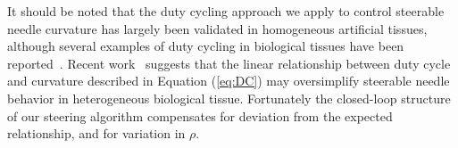 It should be noted that the duty cycling approach we apply to control steerable needle curvature has largely been validated in homogeneous artificial tissues, although several examples of duty cycling in biological tissues have been reported~\cite{Swaney2013,Engh2010,Patil2014}. Recent work~\cite{Patil2014} suggests that the linear relationship between duty cycle and curvature described in Equation (\ref{eq:DC}) may oversimplify steerable needle behavior in heterogeneous biological tissue. Fortunately the closed-loop structure of our steering algorithm compensates for deviation from the expected relationship, and for variation in $\rho$.